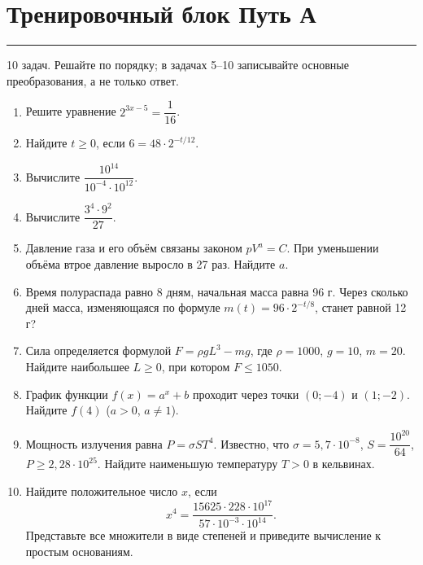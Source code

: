 \documentclass[a4paper,12pt]{article}
\newcommand{\sectionline}{\par\vspace{2pt}\noindent\textcolor{accent}{\rule{\linewidth}{0.5pt}}\par\vspace{3pt}}
\begin{document}
\section*{Тренировочный блок \hfill Путь А}
\sectionline
\textcolor{softgray}{10 задач. Решайте по порядку; в задачах 5--10 записывайте основные преобразования, а не только ответ.}
\begin{enumerate}
\item Решите уравнение \(2^{3x-5}=\dfrac1{16}\).
\item Найдите \(t\ge0\), если \(6=48\cdot2^{-t/12}\).
\item Вычислите \(\dfrac{10^{14}}{10^{-4}\cdot10^{12}}\).
\item Вычислите \(\dfrac{3^4\cdot9^2}{27}\).
\item Давление газа и его объём связаны законом \(pV^a=C\). При уменьшении объёма втрое давление выросло в 27 раз. Найдите \(a\).
\item Время полураспада равно 8 дням, начальная масса равна 96 г. Через сколько дней масса, изменяющаяся по формуле \(m(t)=96\cdot2^{-t/8}\), станет равной 12 г?
\item Сила определяется формулой \(F=\rho gL^3-mg\), где \(\rho=1000\), \(g=10\), \(m=20\). Найдите наибольшее \(L\ge0\), при котором \(F\le1050\).
\item График функции \(f(x)=a^x+b\) проходит через точки \((0;-4)\) и \((1;-2)\). Найдите \(f(4)\) (\(a>0\), \(a\ne1\)).
\item Мощность излучения равна \(P=\sigma ST^4\). Известно, что \(\sigma=5{,}7\cdot10^{-8}\), \(S=\dfrac{10^{20}}{64}\), \(P\ge2{,}28\cdot10^{25}\). Найдите наименьшую температуру \(T>0\) в кельвинах.
\item Найдите положительное число \(x\), если
\[
x^4=\frac{15625\cdot228\cdot10^{17}}{57\cdot10^{-3}\cdot10^{14}}.
\]
Представьте все множители в виде степеней и приведите вычисление к простым основаниям.
\end{enumerate}

\clearpage
\end{document}
